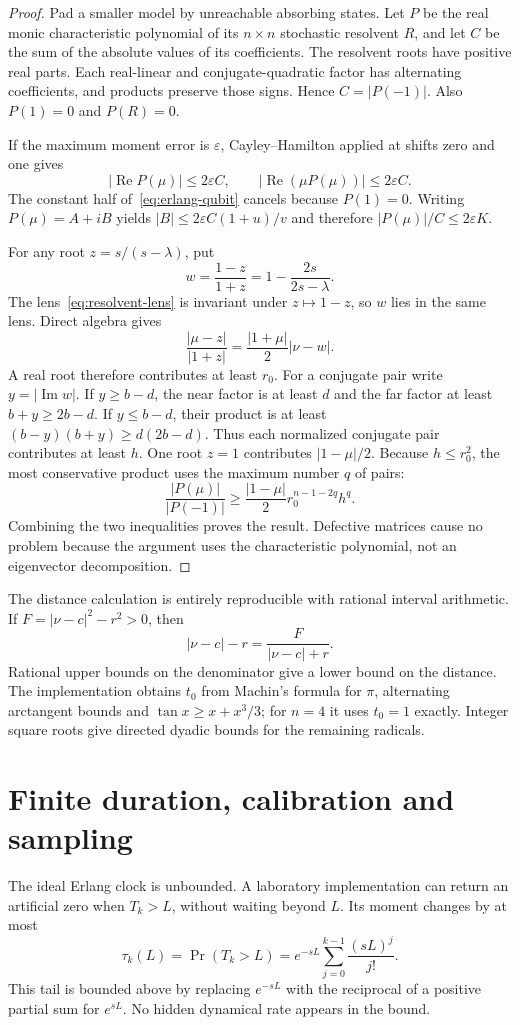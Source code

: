 \begin{proof}
Pad a smaller model by unreachable absorbing states. Let $P$ be the real monic
characteristic polynomial of its $n\times n$ stochastic resolvent $R$, and let
$C$ be the sum of the absolute values of its coefficients. The resolvent roots
have positive real parts. Each real-linear and conjugate-quadratic factor has
alternating coefficients, and products preserve those signs. Hence
$C=|P(-1)|$. Also $P(1)=0$ and $P(R)=0$.

If the maximum moment error is $\varepsilon$, Cayley--Hamilton applied at shifts
zero and one gives
\[
 |\operatorname{Re}P(\mu)|\leq2\varepsilon C,
 \qquad
 |\operatorname{Re}(\mu P(\mu))|\leq2\varepsilon C.
\]
The constant half of~\eqref{eq:erlang-qubit} cancels because $P(1)=0$.
Writing $P(\mu)=A+iB$ yields
$|B|\leq2\varepsilon C(1+u)/v$ and therefore
$|P(\mu)|/C\leq2\varepsilon K$.

For any root $z=s/(s-\lambda)$, put
\[
 w=\frac{1-z}{1+z}=1-\frac{2s}{2s-\lambda}.
\]
The lens~\eqref{eq:resolvent-lens} is invariant under $z\mapsto1-z$, so $w$ lies
in the same lens. Direct algebra gives
\[
 \frac{|\mu-z|}{|1+z|}=\frac{|1+\mu|}{2}|\nu-w|.
\]
A real root therefore contributes at least $r_0$. For a conjugate pair write
$y=|\operatorname{Im}w|$. If $y\geq b-d$, the near factor is at least $d$ and
the far factor at least $b+y\geq2b-d$. If $y\leq b-d$, their product is at least
$(b-y)(b+y)\geq d(2b-d)$. Thus each normalized conjugate pair contributes at
least $h$. One root $z=1$ contributes $|1-\mu|/2$. Because $h\leq r_0^2$,
the most conservative product uses the maximum number $q$ of pairs:
\[
 \frac{|P(\mu)|}{|P(-1)|}
 \geq\frac{|1-\mu|}{2}r_0^{n-1-2q}h^q.
\]
Combining the two inequalities proves the result. Defective matrices cause no
problem because the argument uses the characteristic polynomial, not an
eigenvector decomposition.
\end{proof}

The distance calculation is entirely reproducible with rational interval
arithmetic. If $F=|\nu-c|^2-r^2>0$, then
\[
 |\nu-c|-r=\frac{F}{|\nu-c|+r}.
\]
Rational upper bounds on the denominator give a lower bound on the distance.
The implementation obtains $t_0$ from Machin's formula for $\pi$, alternating
arctangent bounds and $\tan x\geq x+x^3/3$; for $n=4$ it uses $t_0=1$ exactly.
Integer square roots give directed dyadic bounds for the remaining radicals.

\section{Finite duration, calibration and sampling}
The ideal Erlang clock is unbounded. A laboratory implementation can return an
artificial zero when $T_k>L$, without waiting beyond $L$. Its moment changes by
at most
\begin{equation}
 \tau_k(L)=\Pr(T_k>L)
 =e^{-sL}\sum_{j=0}^{k-1}\frac{(sL)^j}{j!}.
 \label{eq:erlang-tail}
\end{equation}
This tail is bounded above by replacing $e^{-sL}$ with the reciprocal of a
positive partial sum for $e^{sL}$. No hidden dynamical rate appears in the bound.

